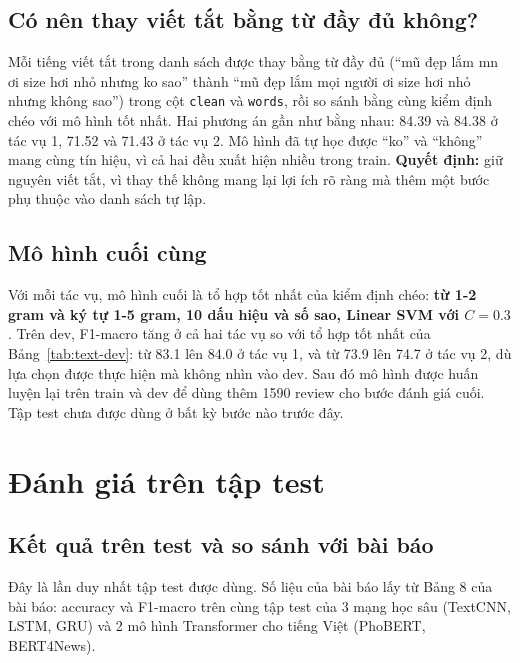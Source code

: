 \subsection{Có nên thay viết tắt bằng từ đầy đủ không?}
\label{sec:text-abbr-cv}
Mỗi tiếng viết tắt trong danh sách được thay bằng từ đầy đủ (``mũ đẹp lắm mn ơi size hơi nhỏ nhưng ko sao'' thành
``mũ đẹp lắm mọi người ơi size hơi nhỏ nhưng không sao'') trong cột \texttt{clean} và \texttt{words}, rồi so sánh bằng cùng kiểm định chéo
với mô hình tốt nhất. Hai phương án gần như bằng nhau: 84.39 và 84.38 ở tác vụ 1, 71.52 và 71.43 ở tác vụ 2. Mô hình đã tự học được ``ko''
và ``không'' mang cùng tín hiệu, vì cả hai đều xuất hiện nhiều trong train. \textbf{Quyết định:} giữ nguyên viết tắt, vì thay thế không mang lại
lợi ích rõ ràng mà thêm một bước phụ thuộc vào danh sách tự lập.

\subsection{Mô hình cuối cùng}
Với mỗi tác vụ, mô hình cuối là tổ hợp tốt nhất của kiểm định chéo: \textbf{từ 1-2 gram và ký tự 1-5 gram, 10 dấu hiệu và số sao, Linear SVM với $C = 0.3$}.
Trên dev, F1-macro tăng ở cả hai tác vụ so với tổ hợp tốt nhất của Bảng~\ref{tab:text-dev}: từ 83.1 lên 84.0 ở tác vụ 1, và từ 73.9 lên 74.7 ở tác vụ 2,
dù lựa chọn được thực hiện mà không nhìn vào dev. Sau đó mô hình được huấn luyện lại trên train và dev để dùng thêm 1590 review cho bước đánh giá cuối.
Tập test chưa được dùng ở bất kỳ bước nào trước đây.

\section{Đánh giá trên tập test}
\label{sec:text-eval}

\subsection{Kết quả trên test và so sánh với bài báo}
Đây là lần duy nhất tập test được dùng. Số liệu của bài báo lấy từ Bảng 8 của bài báo: accuracy và F1-macro trên cùng tập test của 3 mạng học sâu
(TextCNN, LSTM, GRU) và 2 mô hình Transformer cho tiếng Việt (PhoBERT, BERT4News).

